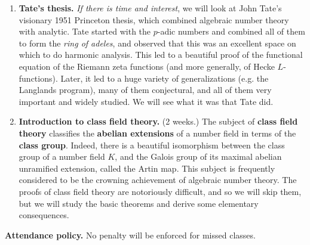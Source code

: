 \documentclass[11pt]{amsart}
\theoremstyle{remark}
\numberwithin{theorem}{section} \numberwithin{equation}{section}
\begin{document}
\begin{enumerate}
\item {\bf Tate's thesis.} {\itshape If there is time and interest}, we will look at John Tate's visionary 1951 Princeton thesis, which
combined algebraic number theory with analytic. Tate started with the $p$-adic numbers and combined all of them to form the {\itshape
ring of adeles}, and observed that this was an excellent space on which to do harmonic analysis. This led to a beautiful proof of
the functional equation of the Riemann zeta functions (and more generally, of Hecke $L$-functions). Later, it led to a huge variety
of generalizations (e.g. the Langlands program), many of them conjectural, and all of them very important and widely studied. 
We will see what it was that Tate did.

\item {\bf Introduction to class field theory.} (2 weeks.) The subject of {\bf class field theory} classifies the {\bf abelian extensions} of
a number field in terms of the {\bf class group}. Indeed, there is a beautiful isomorphism between the class group of a number
field $K$, and the Galois group of its maximal abelian unramified extension, called the Artin map. This subject is frequently considered
to be the crowning achievement of algebraic number theory. The proofs of class field theory
are notoriously difficult, and so we will skip them, but we will study the basic theorems and derive some elementary consequences.
\end{enumerate}

{\bf Attendance policy.} No penalty will be enforced for missed classes.
\end{document}
